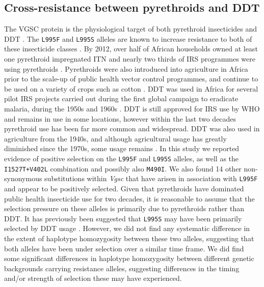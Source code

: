 \documentclass[a4paper,11pt,abstracton,hidelinks]{scrartcl}
\begin{document}
\subsection*{Cross-resistance between pyrethroids and DDT}


%
The VGSC protein is the physiological target of both pyrethroid insecticides and DDT \cite{Davies2007a}.
%
The \texttt{L995F} and \texttt{L995S} alleles are known to increase resistance to both of these insecticide classes \cite{Martinez-Torres1998,Ranson2000}.
%
By 2012, over half of African households owned at least one pyrethroid impregnated ITN and nearly two thirds of IRS programmes were using pyrethroids \cite{Hemingway2016}.
%
Pyrethroids were also introduced into agriculture in Africa prior to the scale-up of public health vector control programmes, and continue to be used on a variety of crops such as cotton \cite{Reid2016}.
%
DDT was used in Africa for several pilot IRS projects carried out during the first global campaign to eradicate malaria, during the 1950s and 1960s \cite{Davies2007b}.
%
DDT is still approved for IRS use by WHO and remains in use in some locations, however within the last two decades pyrethroid use has been far more common and widespread.
%
DDT was also used in agriculture from the 1940s, and although agricultural usage has greatly diminished since the 1970s, some usage remains \cite{Abuelmaali2013}.
%
In this study we reported evidence of positive selection on the \texttt{L995F} and \texttt{L995S} alleles, as well as the \texttt{I1527T+V402L} combination and possibly also \texttt{M490I}.
%
We also found 14 other non-synonymous substitutions within \textit{Vgsc} that have arisen in association with \texttt{L995F} and appear to be positively selected.
%
Given that pyrethroids have dominated public health insecticide use for two decades, it is reasonable to assume that the selection pressure on these alleles is primarily due to pyrethroids rather than DDT.
%
It has previously been suggested that \texttt{L995S} may have been primarily selected by DDT usage \cite{Lynd2010}.
%
However, we did not find any systematic difference in the extent of haplotype homozygosity between these two alleles, suggesting that both alleles have been under selection over a similar time frame.
%
We did find some significant differences in haplotype homozygosity between different genetic backgrounds carrying resistance alleles, suggesting differences in the timing and/or strength of selection these may have experienced.
\end{document}
